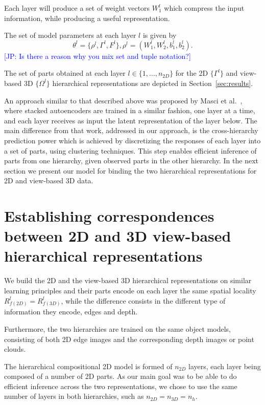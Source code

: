 \documentclass[runningheads]{llncs}
\newcommand{\commentJP}[1]{\textcolor{blue}{[JP: #1]}}
\begin{document}
Each layer will produce a set of weight vectors $W_1^l$ which compress the input information, while producing a useful representation. 

The set of model parameters at each layer $l$ is  given by
\begin{equation}
\theta^l = \{\rho^l,\Gamma^l,F^l\},
\rho^l=(W_1^l,W_2^l,b_1^l,b_2^l).
\end{equation}
\commentJP{Is there a reason why you mix set and tuple notation?}

The set of parts obtained at each layer $l\in\{1,\ldots,n_{2D}\}$ for the 2D $\{\Gamma^l\}$ and view-based 3D $\{\Omega^l\}$ hierarchical representations are depicted in Section~\ref{sec:results}.

An approach similar to that described above was proposed by Masci et al.~\cite{Masci2011}, where stacked autoencoders are trained in a similar fashion, one layer at a time, and each layer receives as input the latent representation of the layer below. The main difference from that work, addressed in our approach, is the cross-hierarchy prediction power which is achieved by discretizing the responses of each layer into a set of parts, using clustering techniques. This step enables efficient inference of parts from one hierarchy, given observed parts in the other hierarchy. In the next section we present our model for binding the two hierarchical representations for 2D and view-based 3D data.
 
\section{Establishing correspondences between 2D and 3D view-based hierarchical representations}
\label{sec:analysis}

We build the 2D and the view-based 3D hierarchical representations on similar learning principles and their parts encode on each layer the same spatial locality $R_{f(2D)}^l=R_{f(3D)}^l$, while the difference consists in the different type of information they encode, edges and depth.
	
Furthermore, the two hierarchies are trained on the same object models, consisting of both 2D edge images and the corresponding depth images or point clouds.  

The hierarchical compositional 2D model is formed of $n_{2D}$ layers, each layer being composed of a number of 2D parts. 
As our main goal was to be able to do efficient inference across the two representations, we chose to use the same number of layers in both hierarchies, such as $n_{2D}=n_{3D}=n_h$.
\end{document}
